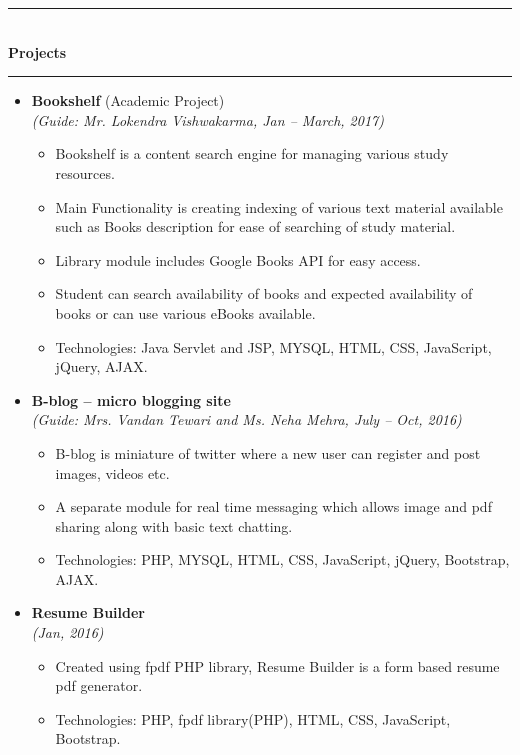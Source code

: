 \documentclass[a4paper,10pt]{article}
\newcommand{\isep}{-2 pt}
\begin{document}
\rule{1pt}{0pt} \\
\indent \textbf{Projects} \\[-0.2cm] \indent \rule{49em}{0.4pt}
\begin{itemize}
	\item \textbf{Bookshelf} (Academic Project) \\
	\emph{(Guide: Mr. Lokendra Vishwakarma, Jan – March, 2017)} \\[-0.6cm]
		\begin{itemize}\itemsep \isep
			\item Bookshelf is a content search engine for managing various study resources.
			\item Main Functionality is creating indexing of various text material available such as Books description for ease of searching of study material.
			\item Library module includes Google Books API for easy access.
			\item Student can search availability of books and expected availability of books or
			can use various eBooks available.
			\item Technologies: Java Servlet and JSP, MYSQL, HTML, CSS, JavaScript, jQuery, AJAX.
		\end{itemize}

	\item \textbf{B-blog – micro blogging site} \\
	\emph{(Guide: Mrs. Vandan Tewari and Ms. Neha Mehra, July – Oct, 2016)} \\[-0.6cm]
		\begin{itemize}\itemsep \isep
		\item B-blog is miniature of twitter where a new user can register and post images, videos etc.
		\item A separate module for real time messaging which allows image and pdf
		sharing along with basic text chatting.
		\item Technologies: PHP, MYSQL, HTML, CSS, JavaScript, jQuery, Bootstrap, AJAX.
		\end{itemize}
	\item \textbf{Resume Builder} \\
	\emph{(Jan, 2016)} \\[-0.6cm]
		\begin{itemize}\itemsep \isep
		\item Created using fpdf PHP library, Resume Builder is a form based resume pdf generator.
		\item Technologies: PHP, fpdf library(PHP), HTML, CSS, JavaScript, Bootstrap.
		\end{itemize}
\end{itemize}
\end{document}
